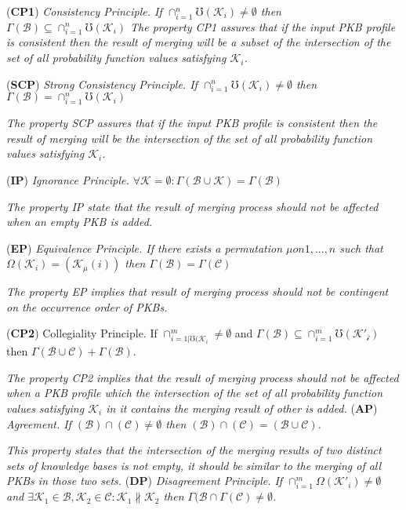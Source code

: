 \documentclass[]{iosart2c}
\begin{document}
(\textbf{CP1}) \textit{Consistency Principle. If $\cap^n_{i=1}\mho(\mathcal{K}_i) \neq \emptyset$ then $\Gamma(\mathcal{B}) \subseteq \cap^n_{i=1}\mho(\mathcal{K}_i)$
The property CP1 assures that if the input PKB profile is consistent then the result of merging will be a subset of the intersection of the set of all probability function values satisfying $\mathcal{K}_i$.}

(\textbf{SCP}) \textit{Strong Consistency Principle. If $\cap^n_{i=1}\mho(\mathcal{K}_i) \neq \emptyset$ then $\Gamma(\mathcal{B}) = \cap^n_{i=1}\mho(\mathcal{K}_i)$}

\textit{The property SCP assures that if the input PKB profile is consistent then the result of merging will be the intersection of the set of all probability function
values satisfying $\mathcal{K}_i$.}

(\textbf{IP}) \textit{Ignorance Principle. $\forall \mathcal{K} = \emptyset : \Gamma(\mathcal{B} \cup \mathcal{K}) = \Gamma(\mathcal{B})$}

\textit{The property IP state that the result of merging process should not be affected when an empty PKB is added.}

(\textbf{EP}) \textit{Equivalence Principle. If there exists a permutation $\mu on {1, ... , n}$ such that $\Omega(\mathcal{K}_i) = (\mathcal{K}_\mu(i))$ then $\Gamma(\mathcal{B}) =  \Gamma(\mathcal{C})$}

\textit{The property EP implies that result of merging process should not be contingent on the occurrence order of PKBs.}

(\textbf{CP2}) Collegiality Principle. If $\cap^m_{i=1|\mho(\mathcal{K}_i} \neq \emptyset$ and $\Gamma(\mathcal{B}) \subseteq \cap^m_{i=1}\mho(\mathcal{K'_i})$ then $\Gamma(\mathcal{B} \cup \mathcal{C}) + \Gamma(\mathcal{B})$.

\textit{The property CP2 implies that the result of merging process should not be affected when a PKB profile which the intersection of the set of all probability function values satisfying $\mathcal{K}_i$ in it contains the merging result of other is added.
}
(\textbf{AP}) \textit{Agreement. If $(\mathcal{B}) \cap (\mathcal{C}) \neq \emptyset$ then $(\mathcal{B}) \cap (\mathcal{C}) = (\mathcal{B} \cup \mathcal{C})$.}

\textit{This property states that the intersection of the merging results of two distinct sets of knowledge bases is not empty, it should be similar to the merging of all PKBs in those two sets.
}
(\textbf{DP}) \textit{Disagreement Principle. If $\cap^m_{i=1}\Omega(\mathcal{K}'_i) \neq \emptyset$ and $\exists \mathcal{K}_1 \in \mathcal{B}, \mathcal{K}_2 \in \mathcal{C}: \mathcal{K}_1 \nparallel \mathcal{K}_2$ then $\Gamma(\mathcal{B} \cap \Gamma(\mathcal{C}) \neq \emptyset$.}
\end{document}
